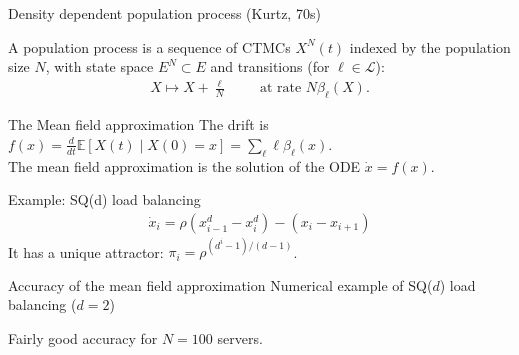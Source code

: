 \documentclass{beamer}
\newcommand\mpage[2]{%
  \begin{minipage}{#1\linewidth}%
    #2%
  \end{minipage}%
}
\newcommand\esp[1]{\mathbb{E}\left[#1\right]}
\newcommand\calL{\mathcal{L}}
\begin{document}
\begin{frame}{Density dependent population process (Kurtz, 70s)}
  
  A population process is a sequence of CTMCs $X^N(t)$ indexed by the
  population size $N$, with state space $E^N\subset E$ and
  transitions (for $\ell\in\calL$): 
  \begin{align*}
    X \mapsto X+\frac{\ell}{N} \qquad \text{ at rate
    $N\beta_\ell(X)$}.
  \end{align*}
  \pause
  
  \begin{center}
    \mpage{.9}{
      \begin{exampleblock}{The Mean field approximation}
        The \alert{drift} is
        $\displaystyle f(x) = \frac{d}{dt}\esp{X(t)\mid
          X(0)=x}=\sum_{\ell} \ell \beta_\ell(x)$.\\
        The mean field approximation is the solution of the ODE
        $\dot{x}=f(x)$.
      \end{exampleblock}
    }
  \end{center}
  \bigskip\pause
  \alert{Example}: SQ(d) load balancing
  \begin{align*}
    \dot{x}_i = \rho(x_{i-1}^d - x_i^d) - (x_i-x_{i+1})
  \end{align*}
  It has a unique attractor: $\pi_i=\rho^{(d^i-1)/(d-1)}$. 
\end{frame}

\begin{frame}{Accuracy of the mean field approximation}
  {Numerical example of SQ($d$) load balancing ($d=2$)}


  \bigskip
  
  \alert{Fairly good accuracy for $N=100$ servers.}
\end{frame}
\end{document}
